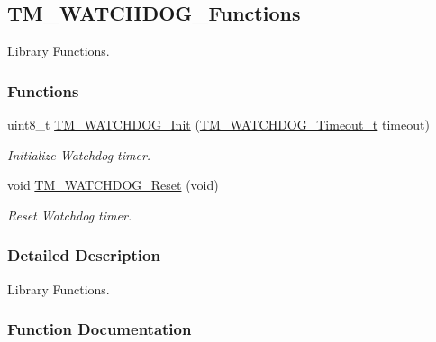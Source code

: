 \hypertarget{group___t_m___w_a_t_c_h_d_o_g___functions}{}\subsection{T\+M\+\_\+\+W\+A\+T\+C\+H\+D\+O\+G\+\_\+\+Functions}
\label{group___t_m___w_a_t_c_h_d_o_g___functions}


Library Functions.  


\subsubsection*{Functions}
\begin{DoxyCompactItemize}
\item 
uint8\+\_\+t \hyperlink{group___t_m___w_a_t_c_h_d_o_g___functions_gafd88c97066851c92fe25c1b5c2cd74cf}{T\+M\+\_\+\+W\+A\+T\+C\+H\+D\+O\+G\+\_\+\+Init} (\hyperlink{group___t_m___w_a_t_c_h_d_o_g___typedefs_ga3c9514e409e8cc70048b868ca9a64671}{T\+M\+\_\+\+W\+A\+T\+C\+H\+D\+O\+G\+\_\+\+Timeout\+\_\+t} timeout)
\begin{DoxyCompactList}\small\item\em Initialize Watchdog timer. \end{DoxyCompactList}\item 
void \hyperlink{group___t_m___w_a_t_c_h_d_o_g___functions_ga73a095378efd3426d63a1879f582220b}{T\+M\+\_\+\+W\+A\+T\+C\+H\+D\+O\+G\+\_\+\+Reset} (void)
\begin{DoxyCompactList}\small\item\em Reset Watchdog timer. \end{DoxyCompactList}\end{DoxyCompactItemize}


\subsubsection{Detailed Description}
Library Functions. 



\subsubsection{Function Documentation}
\hypertarget{group___t_m___w_a_t_c_h_d_o_g___functions_gafd88c97066851c92fe25c1b5c2cd74cf}{}
